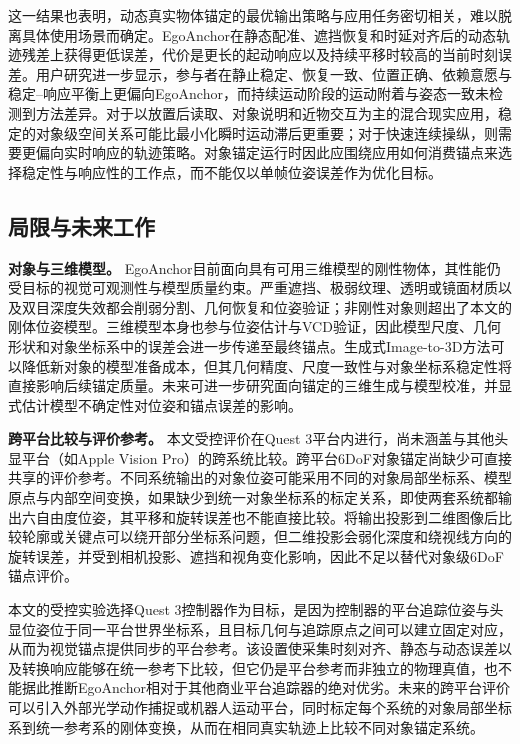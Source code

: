\documentclass[review]{vgtc}
\begin{document}
这一结果也表明，动态真实物体锚定的最优输出策略与应用任务密切相关，难以脱离具体使用场景而确定。EgoAnchor在静态配准、遮挡恢复和时延对齐后的动态轨迹残差上获得更低误差，代价是更长的起动响应以及持续平移时较高的当前时刻误差。用户研究进一步显示，参与者在静止稳定、恢复一致、位置正确、依赖意愿与稳定--响应平衡上更偏向EgoAnchor，而持续运动阶段的运动附着与姿态一致未检测到方法差异。对于以放置后读取、对象说明和近物交互为主的混合现实应用，稳定的对象级空间关系可能比最小化瞬时运动滞后更重要；对于快速连续操纵，则需要更偏向实时响应的轨迹策略。对象锚定运行时因此应围绕应用如何消费锚点来选择稳定性与响应性的工作点，而不能仅以单帧位姿误差作为优化目标。

\subsection{局限与未来工作}

\textbf{对象与三维模型。}
EgoAnchor目前面向具有可用三维模型的刚性物体，其性能仍受目标的视觉可观测性与模型质量约束。严重遮挡、极弱纹理、透明或镜面材质以及双目深度失效都会削弱分割、几何恢复和位姿验证；非刚性对象则超出了本文的刚体位姿模型。三维模型本身也参与位姿估计与VCD验证，因此模型尺度、几何形状和对象坐标系中的误差会进一步传递至最终锚点。生成式Image-to-3D方法可以降低新对象的模型准备成本，但其几何精度、尺度一致性与对象坐标系稳定性将直接影响后续锚定质量。未来可进一步研究面向锚定的三维生成与模型校准，并显式估计模型不确定性对位姿和锚点误差的影响。

\textbf{跨平台比较与评价参考。}
本文受控评价在Quest 3平台内进行，尚未涵盖与其他头显平台（如Apple Vision Pro）的跨系统比较。跨平台6DoF对象锚定尚缺少可直接共享的评价参考。不同系统输出的对象位姿可能采用不同的对象局部坐标系、模型原点与内部空间变换，如果缺少到统一对象坐标系的标定关系，即使两套系统都输出六自由度位姿，其平移和旋转误差也不能直接比较。将输出投影到二维图像后比较轮廓或关键点可以绕开部分坐标系问题，但二维投影会弱化深度和绕视线方向的旋转误差，并受到相机投影、遮挡和视角变化影响，因此不足以替代对象级6DoF锚点评价。

本文的受控实验选择Quest 3控制器作为目标，是因为控制器的平台追踪位姿与头显位姿位于同一平台世界坐标系，且目标几何与追踪原点之间可以建立固定对应，从而为视觉锚点提供同步的平台参考。该设置使采集时刻对齐、静态与动态误差以及转换响应能够在统一参考下比较，但它仍是平台参考而非独立的物理真值，也不能据此推断EgoAnchor相对于其他商业平台追踪器的绝对优劣。未来的跨平台评价可以引入外部光学动作捕捉或机器人运动平台，同时标定每个系统的对象局部坐标系到统一参考系的刚体变换，从而在相同真实轨迹上比较不同对象锚定系统。
\end{document}
